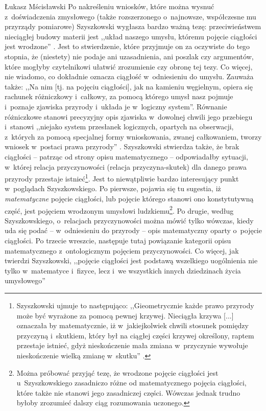 \begin{artplenv}{Łukasz Mścisławski}
Po nakreśleniu wniosków, które można wysnuć z~doświadczenia zmysłowego (także rozszerzonego o~najnowsze, współczesne mu przyrządy pomiarowe) Szyszkowski wygłasza bardzo ważną tezę: przeciwieństwem nieciągłej budowy materii jest ,,układ naszego umysłu, któremu pojęcie ciągłości jest wrodzone''
\parencite[][s.~47]{szyszkowski_o_1916}. %
 Jest to stwierdzenie, które przyjmuje on za oczywiste do tego stopnia, że (niestety) nie podaje ani uzasadnienia, ani poszlak czy argumentów, które mogłyby czytelnikowi ułatwić zrozumienie czy obronę tej tezy. Co więcej, nie wiadomo, co dokładnie oznacza ciągłość w~odniesieniu do umysłu. Zauważa także: ,,Na nim [tj. na pojęciu ciągłości], jak na kamieniu węgielnym, opiera się rachunek różniczkowy i~całkowy, za pomocą którego umysł nasz pojmuje i~poznaje zjawiska przyrody i~układa je w~logiczny system''. Równanie różniczkowe stanowi precyzyjny opis zjawiska w~dowolnej chwili jego przebiegu i~stanowi ,,niejako system przesłanek logicznych, opartych na obserwacji, z~których za pomocą specjalnej formy wnioskowania, zwanej całkowaniem, tworzy wniosek w~postaci prawa przyrody'' 
\parencite[][s.~47]{szyszkowski_o_1916}. %
 Szyszkowski stwierdza także, że brak ciągłości -- patrząc od strony opisu matematycznego -- odpowiadałby sytuacji, w~której relacja przyczynowości (relacja przyczyna-skutek) dla danego prawa przyrody przestaje istnieć\footnote{Szyszkowski ujmuje to następująco: ,,Gieometrycznie każde prawo przyrody może być wyrażone za pomocą pewnej krzywej. Nieciągła krzywa [...] oznaczała by matematycznie, iż w~jakiejkolwiek chwili stosunek pomiędzy przyczyną i~skutkiem, który był na ciągłej części krzywej określony, raptem przestaje istnieć, gdyż nieskończenie mała zmiana w~przyczynie wywołuje nieskończenie wielką zmianę w~skutku'' 
\parencite[][s.~47]{szyszkowski_o_1916}.%
}. Jest to niewątpliwie bardzo interesujący punkt w~poglądach Szyszkowskiego. Po pierwsze, pojawia się tu sugestia, iż \textit{matematyczne} pojęcie ciągłości, lub pojęcie którego stanowi ono konstytutywną część, jest pojęciem wrodzonym umysłowi ludzkiemu\footnote{Można próbować przyjąć tezę, że wrodzone pojęcie ciągłości jest u~Szyszkowskiego zasadniczo różne od matematycznego pojęcia ciągłości, które także nie stanowi jego zasadniczej części. Wówczas jednak trudno byłoby zrozumieć dalszy ciąg rozumowania uczonego.}. Po drugie, według Szyszkowskiego, o~relacjach przyczynowości można mówić tylko wówczas, kiedy uda się podać -- w~odniesieniu do przyrody -- opis matematyczny oparty o~pojęcie ciągłości. Po trzecie wreszcie, następuje tutaj powiązanie kategorii opisu matematycznego z~ontologicznym pojęciem przyczynowości. Co więcej, jak twierdzi Szyszkowski, ,,pojęcie ciągłości jest podstawą wszelkiego uogólnienia nie tylko w~matematyce i~fizyce, lecz i~we wszystkich innych dziedzinach życia umysłowego'' 

\end{artplenv}
